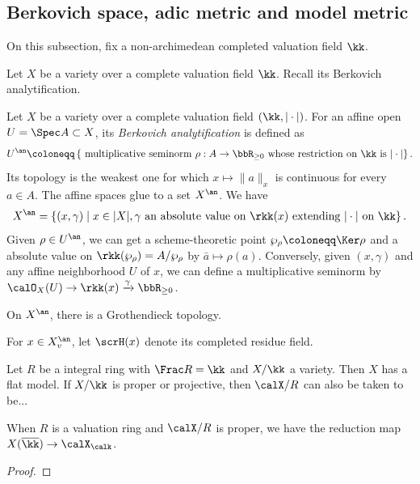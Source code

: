 \subsection[status=draft,tag=0000000,label=\labelNFM{subsec:adic-metric-and-model-metric}]{Berkovich space, adic metric and model metric}

On this subsection, fix a non-archimedean completed valuation field $\kk$.

Let $X$ be a variety over a complete valuation field $\kk$.
Recall its Berkovich analytification.

\begin{construction}[label=\labelNFM{constr:berkovich-analytification}, status=draft, tag=0000000]
	Let $X$ be a variety over a complete valuation field $(\kk,|\cdot|)$.
	For an affine open $U = \Spec A \subset X$, its \emph{Berkovich analytification} is defined as
	\[ U^\an \coloneqq \left\{  \text{  multiplicative seminorm } \rho: A \to \bbR_{\geq 0} \text{ whose restriction on } \kk \text{ is } |\cdot| \right\}. \]
	Its topology is the weakest one for which $x \mapsto \|a\|_x$ is continuous for every $a \in A$.
	The affine spaces glue to a set $X^\an$.
	We have
	\[ X^\an = \left\{ (x,\gamma) \;\middle|\; x \in |X|, \gamma \text{ an absolute value on } \rkk(x) \text{ extending } |\cdot| \text{ on } \kk \right\}. \]
	Given $\rho \in U^\an$, we can get a scheme-theoretic point $\wp_\rho \coloneqq \Ker \rho$ and a absolute value on $\rkk(\wp_\rho) = A/\wp_\rho$ by $\bar{a} \mapsto \rho(a)$.
	Conversely, given $(x,\gamma)$ and any affine neighborhood $U$ of $x$, we can define a multiplicative seminorm by $\calO_X(U) \to \rkk(x) \xrightarrow{\gamma} \bbR_{\geq 0}$.

	On $X^\an$, there is a Grothendieck topology.
	\Yang{}


	For $x \in X_v^\an$, let $\scrH(x)$ denote its completed residue field.
	\Yang{}
\end{construction}

\begin{proposition}[label=\labelNFM{prop:spreading-out-for-berkovich}, status=draft, tag=0000000]
	Let $R$ be a integral ring with $\Frac R = \kk$ and $X/\kk$ a variety.
	Then $X$ has a flat model.
	If $X/\kk$ is proper or projective, then $\calX/R$ can also be taken to be...

	When $R$ is a valuation ring and $\calX/R$ is proper, we have the reduction map $X(\overline{\kk}) \to \calX_\calk$.
\end{proposition}
\begin{proof}
	\Yang{}
\end{proof}

